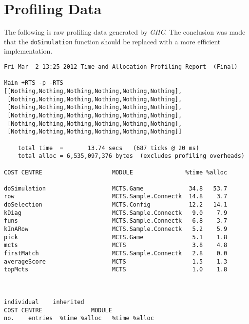 \chapter{Profiling Data}\label{app:profiling}
The following is raw profiling data generated by \textit{GHC}. The conclusion was made that the \texttt{doSimulation} function should be replaced with a more efficient implementation.
\begin{tiny}
\begin{verbatim}
Fri Mar  2 13:25 2012 Time and Allocation Profiling Report  (Final)

Main +RTS -p -RTS 
[[Nothing,Nothing,Nothing,Nothing,Nothing,Nothing], 
 [Nothing,Nothing,Nothing,Nothing,Nothing,Nothing], 
 [Nothing,Nothing,Nothing,Nothing,Nothing,Nothing],
 [Nothing,Nothing,Nothing,Nothing,Nothing,Nothing],
 [Nothing,Nothing,Nothing,Nothing,Nothing,Nothing],
 [Nothing,Nothing,Nothing,Nothing,Nothing,Nothing]]

	total time  =       13.74 secs   (687 ticks @ 20 ms)
	total alloc = 6,535,097,376 bytes  (excludes profiling overheads)

COST CENTRE                    MODULE               %time %alloc

doSimulation                   MCTS.Game             34.8   53.7
row                            MCTS.Sample.Connectk  14.8    3.7
doSelection                    MCTS.Config           12.2   14.1
kDiag                          MCTS.Sample.Connectk   9.0    7.9
funs                           MCTS.Sample.Connectk   6.8    3.7
kInARow                        MCTS.Sample.Connectk   5.2    5.9
pick                           MCTS.Game              5.1    1.8
mcts                           MCTS                   3.8    4.8
firstMatch                     MCTS.Sample.Connectk   2.8    0.0
averageScore                   MCTS                   1.5    1.3
topMcts                        MCTS                   1.0    1.8


                                                                                               individual    inherited
COST CENTRE              MODULE                                               no.    entries  %time %alloc   %time %alloc


\end{verbatim}
\end{tiny}
